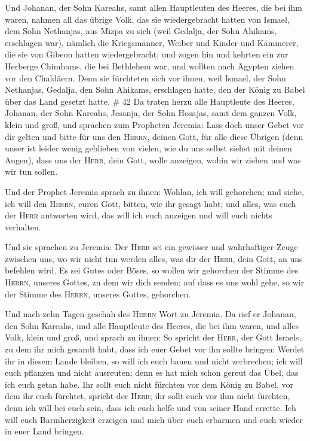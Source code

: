  Und Johanan, der Sohn Kareahs, samt allen Hauptleuten
des Heeres, die bei ihm waren, nahmen all das übrige Volk, das sie
wiedergebracht hatten von Ismael, dem Sohn Nethanjas, aus Mizpa zu sich
(weil Gedalja, der Sohn Ahikams, erschlagen war), nämlich die
Kriegsmänner, Weiber und Kinder und Kämmerer, die sie von Gibeon hatten
wiedergebracht;  und zogen hin und kehrten ein zur
Herberge Chimhams, die bei Bethlehem war, und wollten nach Ägypten
ziehen vor den Chaldäern.  Denn sie fürchteten sich vor
ihnen, weil Ismael, der Sohn Nethanjas, Gedalja, den Sohn Ahikams,
erschlagen hatte, den der König zu Babel über das Land gesetzt hatte. \#
42  Da traten herzu alle Hauptleute des Heeres, Johanan,
der Sohn Kareahs, Jesanja, der Sohn Hosajas, samt dem ganzen Volk, klein
und groß,  und sprachen zum Propheten Jeremia: Lass doch
unser Gebet vor dir gelten und bitte für uns den \textsc{Herrn}, deinen
Gott, für alle diese Übrigen (denn unser ist leider wenig geblieben von
vielen, wie du uns selbst siehst mit deinen Augen),  dass
uns der \textsc{Herr}, dein Gott, wolle anzeigen, wohin wir ziehen und
was wir tun sollen.

 Und der Prophet Jeremia sprach zu ihnen: Wohlan, ich will
gehorchen; und siehe, ich will den \textsc{Herrn}, euren Gott, bitten,
wie ihr gesagt habt; und alles, was euch der \textsc{Herr} antworten
wird, das will ich euch anzeigen und will euch nichts verhalten.

 Und sie sprachen zu Jeremia: Der \textsc{Herr} sei ein
gewisser und wahrhaftiger Zeuge zwischen uns, wo wir nicht tun werden
alles, was dir der \textsc{Herr}, dein Gott, an uns befehlen wird.
 Es sei Gutes oder Böses, so wollen wir gehorchen der
Stimme des \textsc{Herrn}, unseres Gottes, zu dem wir dich senden; auf
dass es uns wohl gehe, so wir der Stimme des \textsc{Herrn}, unseres
Gottes, gehorchen.

 Und nach zehn Tagen geschah des \textsc{Herrn} Wort zu
Jeremia.  Da rief er Johanan, den Sohn Kareahs, und alle
Hauptleute des Heeres, die bei ihm waren, und alles Volk, klein und
groß,  und sprach zu ihnen: So spricht der \textsc{Herr},
der Gott Israels, zu dem ihr mich gesandt habt, dass ich euer Gebet vor
ihn sollte bringen:  Werdet ihr in diesem Lande bleiben,
so will ich euch bauen und nicht zerbrechen; ich will euch pflanzen und
nicht ausreuten; denn es hat mich schon gereut das Übel, das ich euch
getan habe.  Ihr sollt euch nicht fürchten vor dem König
zu Babel, vor dem ihr euch fürchtet, spricht der \textsc{Herr}; ihr
sollt euch vor ihm nicht fürchten, denn ich will bei euch sein, dass ich
euch helfe und von seiner Hand errette.  Ich will euch
Barmherzigkeit erzeigen und mich über euch erbarmen und euch wieder in
euer Land bringen.

